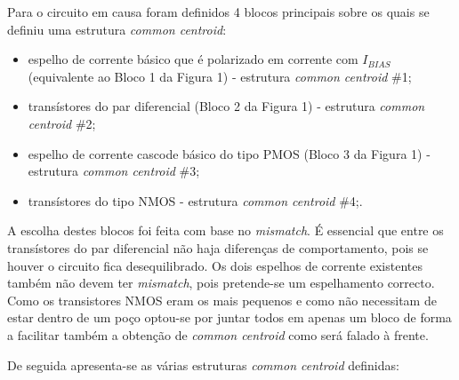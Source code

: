 \documentclass[11pt]{article}
\numberwithin{equation}{section}
\begin{document}
Para o circuito em causa foram definidos 4 blocos principais sobre os quais se definiu uma estrutura \textit{common centroid}:

\vspace{-2mm}

\begin{itemize}
	\item espelho de corrente básico que é polarizado em corrente com $I_{BIAS}$ (equivalente ao Bloco 1 da Figura 1) - estrutura \textit{common centroid} \#1;
	\vspace{-2mm}
	\item transístores do par diferencial (Bloco 2 da Figura 1) - estrutura \textit{common centroid} \#2;
	\vspace{-2mm}
	\item espelho de corrente cascode básico do tipo PMOS (Bloco 3 da Figura 1) - estrutura \textit{common centroid} \#3;
	\vspace{-2mm}
	\item transístores do tipo NMOS - estrutura \textit{common centroid} \#4;.
\end{itemize}

A escolha destes blocos foi feita com base no \textit{mismatch}. É essencial que entre os transístores do par diferencial não haja diferenças de comportamento, pois se houver o circuito fica desequilibrado. Os dois espelhos de corrente existentes também não devem ter \textit{mismatch}, pois pretende-se um espelhamento correcto. Como os transistores NMOS eram os mais pequenos e como não necessitam de estar dentro de um poço optou-se por juntar todos em apenas um bloco de forma a facilitar também a obtenção de \textit{common centroid} como será falado à frente.

De seguida apresenta-se as várias estruturas \textit{common centroid} definidas:
\end{document}
